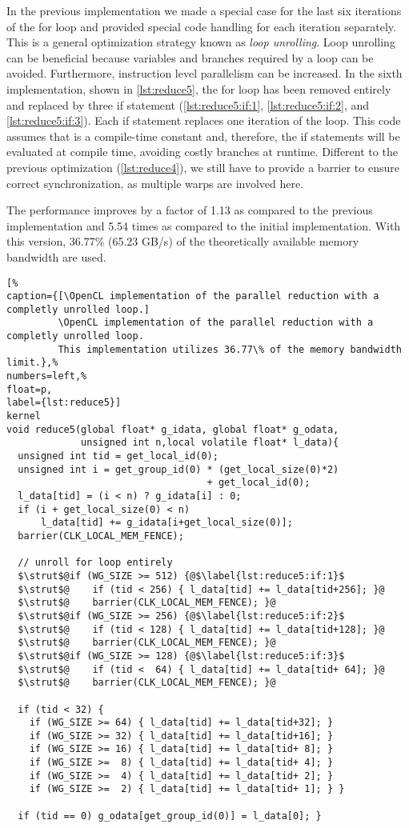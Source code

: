 In the previous implementation we made a special case for the last six iterations of the for loop and provided special code handling for each iteration separately.
This is a general optimization strategy known as \emph{loop unrolling}.
Loop unrolling can be beneficial because variables and branches required by a loop can be avoided.
Furthermore, instruction level parallelism can be increased.
In the sixth implementation, shown in \autoref{lst:reduce5}, the for loop has been removed entirely and replaced by three if statement (\autoref{lst:reduce5:if:1}, \autoref{lst:reduce5:if:2}, and \autoref{lst:reduce5:if:3}).
Each if statement replaces one iteration of the loop.
This code assumes that  is a compile-time constant and, therefore, the if statements will be evaluated at compile time, avoiding costly branches at runtime.
Different to the previous optimization (\autoref{lst:reduce4}), we still have to provide a barrier to ensure correct synchronization, as multiple warps are involved here.

The performance improves by a factor of 1.13 as compared to the previous implementation and 5.54 times as compared to the initial implementation.
With this version, 36.77\% (65.23 GB/s) of the theoretically available memory bandwidth are used.

\begin{lstlisting}[%
caption={[\OpenCL implementation of the parallel reduction with a completly unrolled loop.]
         \OpenCL implementation of the parallel reduction with a completly unrolled loop.
         This implementation utilizes 36.77\% of the memory bandwidth limit.},%
numbers=left,%
float=p,
label={lst:reduce5}]
kernel
void reduce5(global float* g_idata, global float* g_odata,
             unsigned int n,local volatile float* l_data){
  unsigned int tid = get_local_id(0);
  unsigned int i = get_group_id(0) * (get_local_size(0)*2)
                                   + get_local_id(0);
  l_data[tid] = (i < n) ? g_idata[i] : 0;
  if (i + get_local_size(0) < n)
      l_data[tid] += g_idata[i+get_local_size(0)];
  barrier(CLK_LOCAL_MEM_FENCE);

  // unroll for loop entirely
  $\strut$@if (WG_SIZE >= 512) {@$\label{lst:reduce5:if:1}$
  $\strut$@    if (tid < 256) { l_data[tid] += l_data[tid+256]; }@
  $\strut$@    barrier(CLK_LOCAL_MEM_FENCE); }@
  $\strut$@if (WG_SIZE >= 256) {@$\label{lst:reduce5:if:2}$
  $\strut$@    if (tid < 128) { l_data[tid] += l_data[tid+128]; }@
  $\strut$@    barrier(CLK_LOCAL_MEM_FENCE); }@
  $\strut$@if (WG_SIZE >= 128) {@$\label{lst:reduce5:if:3}$
  $\strut$@    if (tid <  64) { l_data[tid] += l_data[tid+ 64]; }@
  $\strut$@    barrier(CLK_LOCAL_MEM_FENCE); }@

  if (tid < 32) {
    if (WG_SIZE >= 64) { l_data[tid] += l_data[tid+32]; }
    if (WG_SIZE >= 32) { l_data[tid] += l_data[tid+16]; }
    if (WG_SIZE >= 16) { l_data[tid] += l_data[tid+ 8]; }
    if (WG_SIZE >=  8) { l_data[tid] += l_data[tid+ 4]; }
    if (WG_SIZE >=  4) { l_data[tid] += l_data[tid+ 2]; }
    if (WG_SIZE >=  2) { l_data[tid] += l_data[tid+ 1]; } }

  if (tid == 0) g_odata[get_group_id(0)] = l_data[0]; }
\end{lstlisting}


